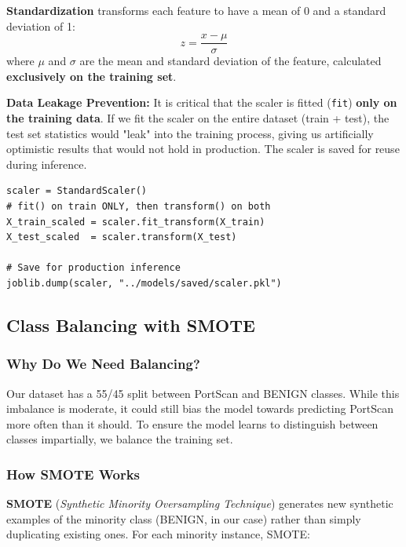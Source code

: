 \textbf{Standardization} transforms each feature to have a mean of 0 and a standard deviation of 1:
\begin{equation}
    z = \frac{x - \mu}{\sigma}
\end{equation}
where $\mu$ and $\sigma$ are the mean and standard deviation of the feature, calculated \textbf{exclusively on the training set}.

\textbf{Data Leakage Prevention:} It is critical that the scaler is fitted (\texttt{fit}) \textbf{only on the training data}. If we fit the scaler on the entire dataset (train + test), the test set statistics would "leak" into the training process, giving us artificially optimistic results that would not hold in production. The scaler is saved for reuse during inference.

\begin{lstlisting}[caption={Standardization with data leakage prevention}]
scaler = StandardScaler()
# fit() on train ONLY, then transform() on both
X_train_scaled = scaler.fit_transform(X_train)
X_test_scaled  = scaler.transform(X_test)

# Save for production inference
joblib.dump(scaler, "../models/saved/scaler.pkl")
\end{lstlisting}

\subsection{Class Balancing with SMOTE}
\label{sec:smote}

\subsubsection{Why Do We Need Balancing?}

Our dataset has a 55/45 split between PortScan and BENIGN classes. While this imbalance is moderate, it could still bias the model towards predicting PortScan more often than it should. To ensure the model learns to distinguish between classes impartially, we balance the training set.

\subsubsection{How SMOTE Works}

\textbf{SMOTE} (\textit{Synthetic Minority Oversampling Technique}) generates new synthetic examples of the minority class (BENIGN, in our case) rather than simply duplicating existing ones. For each minority instance, SMOTE:

